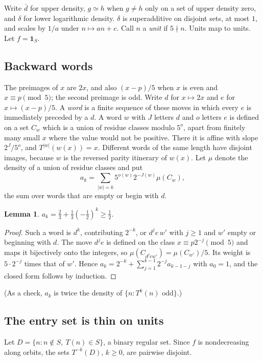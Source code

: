 \documentclass[11pt]{article}
\newtheorem{lemma}[theorem]{Lemma}
\theoremstyle{remark}
\newcommand{\ud}{\bar d}
\newcommand{\ld}{\delta}
\begin{document}
Write $\ud$ for upper density, $g\simeq h$ when $g\ne h$ only on a set of upper
density zero, and $\ld$ for lower logarithmic density. $\ld$ is superadditive on
disjoint sets, at most $1$, and scales by $1/a$ under $n\mapsto an+c$. Call $n$
a \emph{unit} if $5\nmid n$. Units map to units. Let $f=\mathbf 1_S$.

\subsection{Backward words}

The preimages of $x$ are $2x$, and also $(x-p)/5$ when $x$ is even and
$x\equiv p\pmod 5$; the second preimage is odd. Write $d$ for $x\mapsto 2x$ and
$e$ for $x\mapsto(x-p)/5$. A \emph{word} is a finite sequence of these moves in
which every $e$ is immediately preceded by a $d$. A word $w$ with $J$ letters
$d$ and $o$ letters $e$ is defined on a set $C_w$ which is a union of residue
classes modulo $5^{o}$, apart from finitely many small $x$ where the value
would not be positive. There it is affine with slope $2^{J}/5^{o}$, and
$T^{|w|}(w(x))=x$. Different words of the same length have disjoint images,
because $w$ is the reversed parity itinerary of $w(x)$. Let $\mu$ denote the
density of a union of residue classes and put
\[
a_k=\sum_{|w|=k}5^{o(w)}2^{-J(w)}\mu(C_w),
\]
the sum over words that are empty or begin with $d$.

\begin{lemma}\label{mass}
$a_k=\tfrac23+\tfrac13(-\tfrac12)^k\ge\tfrac12$.
\end{lemma}
\begin{proof}
Such a word is $d^k$, contributing $2^{-k}$, or $d^{j}e\,w'$ with $j\ge1$ and
$w'$ empty or beginning with $d$. The move $d^je$ is defined on the class
$x\equiv p2^{-j}\pmod5$ and maps it bijectively onto the integers, so
$\mu(C_{d^jew'})=\mu(C_{w'})/5$. Its weight is $5\cdot2^{-j}$ times that of
$w'$. Hence $a_k=2^{-k}+\sum_{j=1}^{k-1}2^{-j}a_{k-1-j}$ with $a_0=1$, and the
closed form follows by induction.
\end{proof}

(As a check, $a_k$ is twice the density of $\{n:T^k(n)\text{ odd}\}$.)

\subsection{The entry set is thin on units}

Let $D=\{n:n\notin S,\ T(n)\in S\}$, a binary regular set. Since $f$ is
nondecreasing along orbits, the sets $T^{-k}(D)$, $k\ge0$, are pairwise
disjoint.
\end{document}
